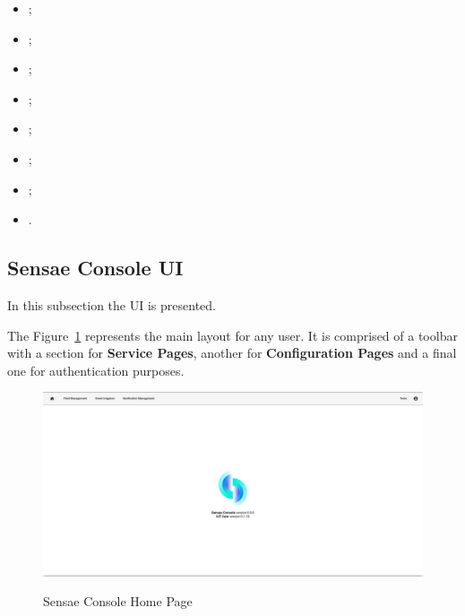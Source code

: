 \begin{itemize}
    \item {};
    \item {};
    \item {};
    \item {};
    \item {};
    \item {};
    \item {};
    \item {}.
\end{itemize}

\subsection{Sensae Console UI}
\label{subsec:implementation:description:ui}

In this subsection the \gls{UI} is presented.

The Figure~\ref{fig:implementation:description:ui:home} represents the main layout for any user. It is comprised of a toolbar with a section for \textbf{Service Pages}, another for \textbf{Configuration Pages} and a final one for authentication purposes.

\begin{figure}[H]
    \centering
    \resizebox{\columnwidth}{!}
    {
       \includegraphics{assets/figures/ui/home.png}
    }
    \caption[Sensae Console - Home Page]{Sensae Console Home Page}
    \label{fig:implementation:description:ui:home}
\end{figure}

